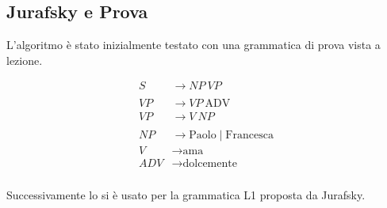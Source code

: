 \subsection{Jurafsky e Prova}

L'algoritmo è stato inizialmente testato con una grammatica di prova vista a lezione. 

\begin{tcolorbox}[title=Esempio "Paolo ama Francesca dolcemente",colback=gray!5!white,colframe=gray!75!black]
\begin{align*}
S &\rightarrow NP\ VP \\
\\
VP &\rightarrow VP\ \text{ADV} \\
VP &\rightarrow V\ NP \\
\\
NP &\rightarrow \text{Paolo} \mid \text{Francesca} \\
V &\rightarrow \text{ama} \\
ADV &\rightarrow \text{dolcemente}
\end{align*}
\end{tcolorbox}

\subsubsection{}
\pagebreak
Successivamente lo si è usato per la grammatica L1 proposta da Jurafsky. 


